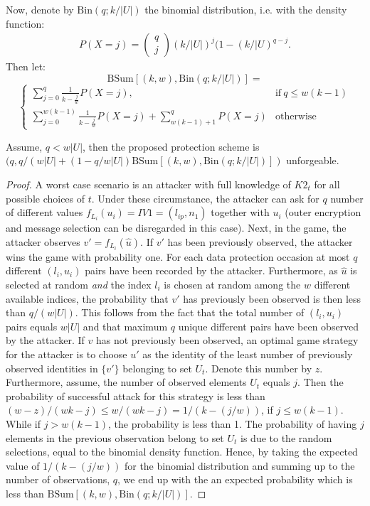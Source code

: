{Now, denote by $\text{Bin}(q; k/|U|)$ the binomial distribution, i.e. with the density function:
\begin{eqnarray*}
P(X=j) = 
\begin{pmatrix}
q \\
j
\end{pmatrix}
(k/|U|)^j(1-(k/|U)^{q-j}.
\end{eqnarray*}
Then let: 
\[
 \text{BSum}[(k,w),\text{Bin}(q;k/|U|)] =
 \]
 \[
\begin{cases}
\sum\limits_{j=0}^{q} \frac{1}{k-\frac{j}{w}} P(X=j), & \text{if} \ q \leq w(k-1) \\
\sum\limits_{j=0}^{w(k-1)}\!\frac{1}{k-\frac{j}{w}} P(X=j) + \!\!\!\!\!\! \sum\limits_{w(k-1)+1}^q \!\!\!\!\!P(X=j) & \!\text{otherwise}
\end{cases}
\]
\begin{prop}
\label{analysis:idunforgeable}
Assume, $q < w|U|$, then the proposed protection scheme is $(q,q/(w|U|+(1-q/w|U|)\text{BSum}[(k,w),\text{Bin}(q;k/|U|)])$ unforgeable. 
\end{prop}
\begin{proof}
A worst case scenario is an attacker with full knowledge of $K2_t$ for all possible choices of $t$. Under these circumstance, the attacker can ask for $q$ number of different values $f_{L_i}(u_i) = IV1 = (l_{ip},n_1)$  together with $u_i$ (outer encryption and message selection can be disregarded in this case). Next, in the game, the attacker observes $v' = f_{L_i}(\hat{u})$. If $v'$ has been previously observed, the attacker wins the game with probability one. For each data protection occasion at most $q$ different $(l_{i}, u_i)$ pairs have been recorded by the attacker. Furthermore, as $\hat{u}$ is selected at random \textit{and} the index $l_{i}$ is chosen at random among the $w$ different available indices, the probability that $v'$ has previously been observed is then less than $q/(w|U|)$. This follows from the fact that the total number of $(l_{i}, u_i)$ pairs equals $w|U|$ and that maximum $q$ unique different pairs have been observed by the attacker. If $v$ has not previously been observed, an optimal game strategy for the attacker is to choose $u'$ as the identity of the least number of previously observed identities in $\{v'\}$ belonging to set $U_t$. Denote this number by $z$.  Furthermore, assume, the number of observed elements $U_t$ equals $j$. Then the probability of successful attack for this strategy is less than $(w-z)/(wk-j) \leq w/(wk-j) = 1/(k-(j/w))$, if $j\leq w(k-1)$. While if $j>w(k-1)$, the probability is less than 1. The probability of having $j$ elements in the previous observation belong to set $U_t$ is due to the random selections, equal to the binomial density function. Hence, by taking the expected value of $1/(k-(j/w))$ for the binomial distribution and summing up to the number of observations, $q$, we end up with the an expected probability which is less than $\text{BSum}[(k,w),\text{Bin}(q;k/|U|)]$.

\end{proof}}
